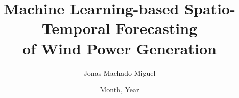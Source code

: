 
\title{Machine Learning-based Spatio-Temporal Forecasting \\ of Wind Power Generation}

\author{Jonas Machado Miguel}





\date{Month, Year}

